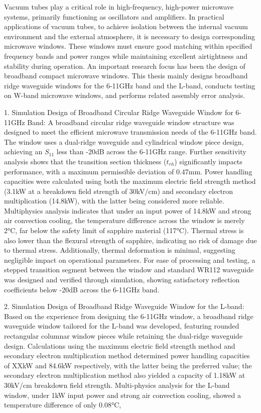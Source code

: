 \documentclass[master]{thesis-uestc}
\begin{document}
\begin{englishabstract}
    Vacuum tubes play a critical role in high-frequency, high-power microwave systems, primarily functioning as oscillators and amplifiers. In practical applications of vacuum tubes, to achieve isolation between the internal vacuum environment and the external atmosphere, it is necessary to design corresponding microwave windows. These windows must ensure good matching within specified frequency bands and power ranges while maintaining excellent airtightness and stability during operation. An important research focus has been the design of broadband compact microwave windows. This thesis mainly designs broadband ridge waveguide windows for the 6-11GHz band and the L-band, conducts testing on W-band microwave windows, and performs related assembly error analysis.

    1. Simulation Design of Broadband Circular Ridge Waveguide Window for 6-11GHz Band: A broadband circular ridge waveguide window structure was designed to meet the efficient microwave transmission needs of the 6-11GHz band. The window uses a dual-ridge waveguide and cylindrical window piece design, achieving an \(S_{11}\) less than -20dB across the 6-11GHz range. Further sensitivity analysis shows that the transition section thickness (\(t_{rh}\)) significantly impacts performance, with a maximum permissible deviation of 0.47mm. Power handling capacities were calculated using both the maximum electric field strength method (3.1kW at a breakdown field strength of 30kV/cm) and secondary electron multiplication (14.8kW), with the latter being considered more reliable. Multiphysics analysis indicates that under an input power of 14.8kW and strong air convection cooling, the temperature difference across the window is merely 2°C, far below the safety limit of sapphire material (117°C). Thermal stress is also lower than the flexural strength of sapphire, indicating no risk of damage due to thermal stress. Additionally, thermal deformation is minimal, suggesting negligible impact on operational parameters. For ease of processing and testing, a stepped transition segment between the window and standard WR112 waveguide was designed and verified through simulation, showing satisfactory reflection coefficients below -20dB across the 6-11GHz band.

    2. Simulation Design of Broadband Ridge Waveguide Window for the L-band: Based on the experience from designing the 6-11GHz window, a broadband ridge waveguide window tailored for the L-band was developed, featuring rounded rectangular columnar window pieces while retaining the dual-ridge waveguide design. Calculations using the maximum electric field strength method and secondary electron multiplication method determined power handling capacities of XXkW and 84.6kW respectively, with the latter being the preferred value; the secondary electron multiplication method also yielded a capacity of 1.18kW at 30kV/cm breakdown field strength. Multi-physics analysis for the L-band window, under 1kW input power and strong air convection cooling, showed a temperature difference of only 0.08°C, 
    

\end{englishabstract}
\end{document}
